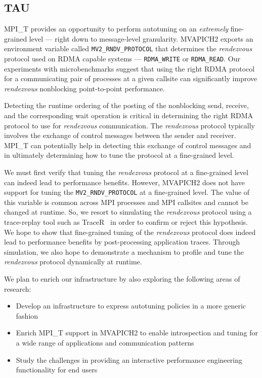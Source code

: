 \subsection{TAU}
MPI\_T provides an opportunity to perform autotuning on an \textit{extremely} fine-grained level --- right down to message-level granularity. MVAPICH2 exports an environment variable called \verb+MV2_RNDV_PROTOCOL+ that determines the \textit{rendezvous} protocol used on RDMA capable systems --- \verb+RDMA_WRITE+ or \verb+RDMA_READ+. Our experiments with microbenchmarks suggest that using the right RDMA protocol for a communicating pair of processes at a given callsite can significantly improve \textit{rendezvous} nonblocking point-to-point performance. 
\par Detecting the runtime ordering of the posting of the nonblocking send, receive, and the corresponding wait operation is critical in determining the right RDMA protocol to use for \textit{rendezvous} communication. The \textit{rendezvous} protocol typically involves the exchange of control messages between the sender and receiver. MPI\_T can potentially help in detecting this exchange of control messages and in ultimately determining how to tune the protocol at a fine-grained level. 
\par We must first verify that tuning the \textit{rendezvous} protocol at a fine-grained level can indeed lead to performance benefits. However, MVAPICH2 does not have support for tuning the \verb+MV2_RNDV_PROTOCOL+ at a fine-grained level. The value of this variable is common across MPI processes and MPI callsites and cannot be changed at runtime. So, we resort to simulating the \textit{rendezvous} protocol using a trace-replay tool such as TraceR~\cite{TraceR} in order to confirm or reject this hypothesis. We hope to show that fine-grained tuning of the \textit{rendezvous} protocol does indeed lead to performance benefits by post-processing application traces. Through simulation, we also hope to demonstrate a mechanism to profile and tune the \textit{rendezvous} protocol dynamically at runtime.
\par We plan to enrich our infrastructure by also exploring the following areas of research:
\begin{itemize}
	\item Develop an infrastructure to express autotuning policies in a more generic fashion
        \item Enrich MPI\_T support in MVAPICH2 to enable introspection and tuning for a wide range of applications and communication patterns
	\item Study the challenges in providing an interactive performance engineering functionality for end users
\end{itemize}

